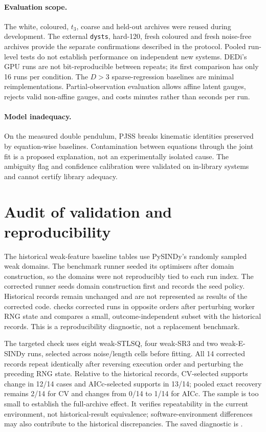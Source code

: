 \paragraph{Evaluation scope.} The white, coloured, $t_3$, coarse and held-out archives were reused during development. The external \texttt{dysts}, hard-120, fresh coloured and fresh noise-free archives provide the separate confirmations described in the protocol. Pooled run-level tests do not establish performance on independent new systems. DEDi's GPU runs are not bit-reproducible between repeats; its first comparison has only 16 runs per condition. The $D>3$ sparse-regression baselines are minimal reimplementations. Partial-observation evaluation allows affine latent gauges, rejects valid non-affine gauges, and costs minutes rather than seconds per run.

\paragraph{Model inadequacy.} On the measured double pendulum, PJSS breaks kinematic identities preserved by equation-wise baselines. Contamination between equations through the joint fit is a proposed explanation, not an experimentally isolated cause. The ambiguity flag and confidence calibration were validated on in-library systems and cannot certify library adequacy.


\section{Audit of validation and reproducibility}
\label{app:baseline-audit}
The historical weak-feature baseline tables use PySINDy's randomly sampled weak domains. The benchmark runner seeded its optimisers after domain construction, so the domains were not reproducibly tied to each run index. The corrected runner seeds domain construction first and records the seed policy. Historical records remain unchanged and are not represented as results of the corrected code.  checks corrected runs in opposite orders after perturbing worker RNG state and compares a small, outcome-independent subset with the historical records. This is a reproducibility diagnostic, not a replacement benchmark.

The targeted check uses eight weak-STLSQ, four weak-SR3 and two weak-E-SINDy runs, selected across noise/length cells before fitting. All 14 corrected records repeat identically after reversing execution order and perturbing the preceding RNG state. Relative to the historical records, CV-selected supports change in 12/14 cases and AICc-selected supports in 13/14; pooled exact recovery remains 2/14 for CV and changes from 0/14 to 1/14 for AICc. The sample is too small to establish the full-archive effect. It verifies repeatability in the current environment, not historical-result equivalence; software-environment differences may also contribute to the historical discrepancies. The saved diagnostic is .

